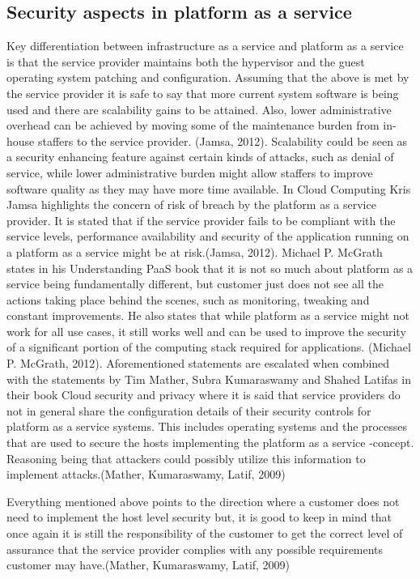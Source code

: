 \documentclass{article}
\begin{document}
\subsection{Security aspects in platform as a service}
Key differentiation between infrastructure as a service and platform as a service is that the service provider maintains both the hypervisor and the guest operating system patching and configuration.
Assuming that the above is met by the service provider it is safe to say that more current system software is being used and there are scalability gains to be attained. Also, lower administrative overhead can be achieved by moving some of the maintenance burden from in-house staffers to the service provider. (Jamsa, 2012). Scalability could be seen as a security enhancing feature against certain kinds of attacks, such as denial of service, while lower administrative burden might allow staffers to improve software quality as they may have more time available.
In Cloud Computing Kris Jamsa highlights the concern of risk of breach by the platform as a service provider. It is stated that if the service provider fails to be compliant with the service levels, performance availability and security of the application running on a platform as a service might be at risk.(Jamsa, 2012).
Michael P. McGrath states in his Understanding PaaS book that it is not so much about platform as a service being fundamentally different, but customer just does not see all the actions taking place behind the scenes, such as monitoring, tweaking and constant improvements. He also states that while platform as a service might not work for all use cases, it still works well and can be used to improve the security of a significant portion of the computing stack required for applications. (Michael P. McGrath, 2012).
Aforementioned statements are escalated when combined with the statements by Tim Mather, Subra Kumaraswamy and Shahed Latifas in their book Cloud security and privacy where it is said that service providers do not in general share the configuration details of their security controls for platform as a service systems. This includes operating systems and the processes that are used to secure the hosts implementing the platform as a service -concept. Reasoning being that attackers could possibly utilize this information to implement attacks.(Mather, Kumaraswamy, Latif, 2009)
\par
Everything mentioned above points to the direction where a customer does not need to implement the host level security but, it is good to keep in mind that once again it is still the responsibility of the customer to get the correct level of assurance that the service provider complies with any possible requirements customer may have.(Mather, Kumaraswamy, Latif, 2009)
\end{document}
